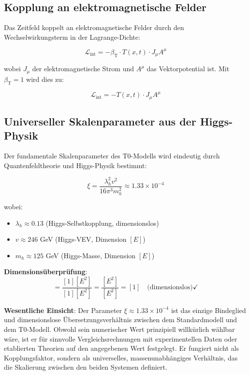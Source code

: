 \documentclass[12pt,a4paper]{article}
\newcommand{\Tfieldt}{T(x,t)}
\newcommand{\betaT}{\beta_{\text{T}}}
\newcommand{\xipar}{\xi}
\begin{document}
	\subsection{Kopplung an elektromagnetische Felder}
	\label{subsec:em_coupling}
	
	Das Zeitfeld koppelt an elektromagnetische Felder durch den Wechselwirkungsterm in der Lagrange-Dichte:
	
	\begin{equation}
		\mathcal{L}_{\text{int}} = -\betaT \cdot \Tfieldt \cdot J_{\mu} A^{\mu}
	\end{equation}
	
	wobei $J_{\mu}$ der elektromagnetische Strom und $A^{\mu}$ das Vektorpotential ist. Mit $\betaT = 1$ wird dies zu:
	
	\begin{equation}
		\mathcal{L}_{\text{int}} = -\Tfieldt \cdot J_{\mu} A^{\mu}
	\end{equation}
	
	\subsection{Universeller Skalenparameter aus der Higgs-Physik}
	\label{subsec:universal_scale_parameter}
	
	Der fundamentale Skalenparameter des T0-Modells wird eindeutig durch Quantenfeldtheorie und Higgs-Physik bestimmt:
	
	\begin{equation}
		\boxed{\xipar = \frac{\lambda_h^2 v^2}{16\pi^3 m_h^2} \approx 1.33 \times 10^{-4}}
		\label{eq:xi_higgs_universal}
	\end{equation}
	
	wobei:
	\begin{itemize}
		\item $\lambda_h \approx 0.13$ (Higgs-Selbstkopplung, dimensionslos)
		\item $v \approx 246$ GeV (Higgs-VEV, Dimension $[E]$)
		\item $m_h \approx 125$ GeV (Higgs-Masse, Dimension $[E]$)
	\end{itemize}
	
	\textbf{Dimensionsüberprüfung}:
	\begin{equation}
		[\xipar] = \frac{[1][E^2]}{[1][E^2]} = \frac{[E^2]}{[E^2]} = [1] \quad \text{(dimensionslos)} \checkmark
	\end{equation}
	
\begin{tcolorbox}[colback=green!5!white,colframe=green!75!black,title=Universeller Skalenparameter]
	\textbf{Wesentliche Einsicht}: Der Parameter $\xipar \approx 1.33 \times 10^{-4}$ ist das einzige Bindeglied und dimensionslose Übersetzungsverhältnis zwischen dem Standardmodell und dem T0-Modell. Obwohl sein numerischer Wert prinzipiell willkürlich wählbar wäre, ist er für sinnvolle Vergleichsrechnungen mit experimentellen Daten oder etablierten Theorien auf den angegebenen Wert festgelegt. Er fungiert nicht als Kopplungsfaktor, sondern als universelles, massenunabhängiges Verhältnis, das die Skalierung zwischen den beiden Systemen definiert.
\end{tcolorbox}
	
\end{document}
